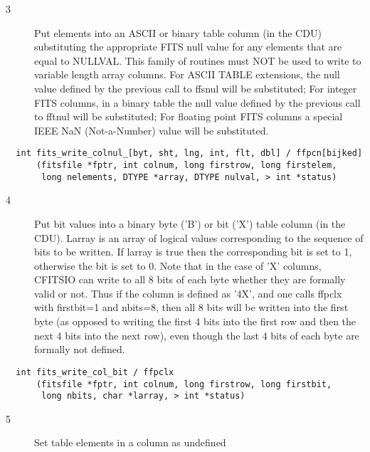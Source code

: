 \begin{description}
\item[3 ] Put elements into an ASCII or binary table column (in the CDU)
    substituting the appropriate FITS null value for any elements that
    are equal to NULLVAL.  This family of routines must NOT be used to
    write to  variable length array columns. For ASCII TABLE extensions, the
    null value defined by the previous call to ffsnul will be substituted;
    For integer FITS columns, in a binary table  the null value
    defined by the previous call to fftnul will be substituted;
    For floating point FITS columns a special IEEE NaN (Not-a-Number)
   value will be substituted.
\end{description}

\begin{verbatim}
  int fits_write_colnul_[byt, sht, lng, int, flt, dbl] / ffpcn[bijked]
      (fitsfile *fptr, int colnum, long firstrow, long firstelem,
       long nelements, DTYPE *array, DTYPE nulval, > int *status)
\end{verbatim}

\begin{description}
\item[4 ] Put bit values into a binary byte ('B') or bit ('X') table column (in the
    CDU).  Larray is an array of logical values corresponding to the sequence of
    bits to be written.  If larray is true then the corresponding bit is
    set to 1, otherwise the bit is set to 0.  Note that in the case of
    'X' columns, CFITSIO can write to all 8 bits of each byte whether
    they are formally valid or not.  Thus if the column is defined as
    '4X', and one calls ffpclx with  firstbit=1 and nbits=8, then all 8 bits
    will be written into the first byte (as opposed to writing the
    first 4 bits into the first row and then the next 4 bits into the
    next row), even though the last 4 bits of each byte are formally
   not defined.
\end{description}

\begin{verbatim}
  int fits_write_col_bit / ffpclx
      (fitsfile *fptr, int colnum, long firstrow, long firstbit,
       long nbits, char *larray, > int *status)
\end{verbatim}

\begin{description}
\item[5 ] Set table elements in a column as undefined
\end{description}

